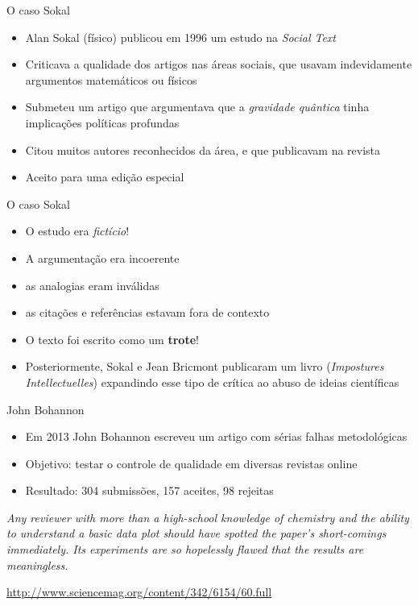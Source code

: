 \documentclass{beamer}
\begin{document}
\begin{frame}{O caso Sokal}
  \begin{itemize}
    \footnotesize
  \item Alan Sokal (físico) publicou em 1996 um estudo na {\em Social
      Text}
    \medskip
  \item Criticava a qualidade dos artigos nas áreas sociais, que
    usavam indevidamente argumentos matemáticos ou físicos
    \medskip
  \item Submeteu um artigo que argumentava que a {\em gravidade
      quântica} tinha implicações políticas profundas
    \medskip
  \item Citou muitos autores reconhecidos da área, e que publicavam na
    revista
    \medskip
  \item Aceito para uma edição especial
  \end{itemize}
\end{frame}

\begin{frame}{O caso Sokal}
  \begin{itemize}
    \footnotesize
  \item O estudo era {\em fictício}!
    \medskip
  \item A argumentação era incoerente
    \medskip
  \item as analogias eram inválidas
    \medskip
  \item as citações e referências estavam fora de contexto
    \medskip
  \item O texto foi escrito como um {\bf trote}!
    \medskip
  \item Posteriormente, Sokal e Jean Bricmont publicaram um livro
    ({\em Impostures Intellectuelles}) expandindo esse tipo de crítica
    ao abuso de ideias científicas
  \end{itemize}
\end{frame}

\begin{frame}{John Bohannon}
  \begin{itemize}
    \footnotesize
  \item Em 2013 John Bohannon escreveu um artigo com sérias falhas
    metodológicas
    \medskip
  \item Objetivo: testar o controle de qualidade em diversas revistas
    online
    \medskip
  \item Resultado: 304 submissões, 157 aceites, 98 rejeitas
  \end{itemize}
    \bigskip
  \begin{block}{}
    \footnotesize
    \em
    Any reviewer with more than a high-school knowledge of chemistry
    and the ability to understand a basic data plot should have
    spotted the paper's short-comings immediately. Its experiments are
    so hopelessly flawed that the results are meaningless.
  \end{block}

  \vfill
  \tiny
  \hfill \url{http://www.sciencemag.org/content/342/6154/60.full}
\end{frame}
\end{document}
